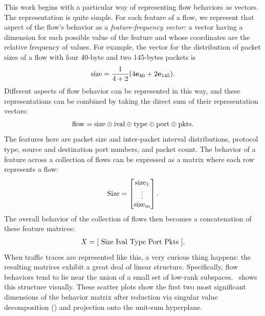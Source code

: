 \documentclass{acm_proc_article-sp}
\begin{document}
This work begins with a particular way of representing flow behaviors as vectors.
The representation is quite simple.
For each feature of a flow, we represent that aspect of the flow's behavior as a \emph{feature-frequency vector}:
a vector having a dimension for each possible value of the feature and whose coordinates are the relative frequency of values.
For example, the vector for the distribution of packet sizes of a flow with four 40-byte and two 145-bytes packets is
\begin{align}
  \text{size} = \frac{1}{4+2}{\left(4\mathbf{e}_{40} + 2\mathbf{e}_{145}\right)}.
\end{align}
Different aspects of flow behavior can be represented in this way, and these representations can be combined by taking the direct sum of their representation vectors:
\begin{align}\eqn{flow}
  \text{flow} =
  \text{size} \directsum
  \text{ival} \directsum
  \text{type} \directsum
  \text{port} \directsum
  \text{pkts}.
\end{align}
The features here are packet size and inter-packet interval distributions,  protocol type, source and destination port numbers, and packet count.
The behavior of a feature across a collection of flows can be expressed as a matrix where each row represents a flow:
\begin{align}\eqn{Size}
  \text{Size} = \begin{bmatrix}
    \text{size}_1 \\
    \vdots \\
    \text{size}_m
  \end{bmatrix}.
\end{align}
The overall behavior of the collection of flows then becomes a concatenation of these feature matrices:
\begin{align}\eqn{X}
  X = \bracket{ ~
    \text{Size} ~
    \text{Ival} ~
    \text{Type} ~
    \text{Port} ~
    \text{Pkts} ~
  }.
\end{align}
When traffic traces are represented like this, a very curious thing happens:
the resulting matrices exhibit a great deal of linear structure.
Specifically, flow behaviors tend to lie near the union of a small set of low-rank subspaces.
~shows this structure visually.
These scatter plots show the first two most significant dimensions of the behavior matrix after reduction via singular value decomposition () and projection onto the unit-sum hyperplane.
\end{document}
